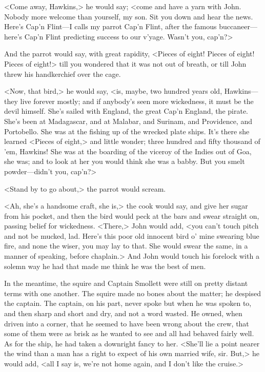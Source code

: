 <Come away, Hawkins,> he would say; <come and have a yarn with John. Nobody more welcome than yourself, my son. Sit you down and hear the news. Here's Cap'n Flint—I calls my parrot Cap'n Flint, after the famous buccaneer—here's Cap'n Flint predicting success to our v'yage. Wasn't you, cap'n?>

And the parrot would say, with great rapidity, <Pieces of eight! Pieces of eight! Pieces of eight!> till you wondered that it was not out of breath, or till John threw his handkerchief over the cage.

<Now, that bird,> he would say, <is, maybe, two hundred years old, Hawkins—they live forever mostly; and if anybody's seen more wickedness, it must be the devil himself. She's sailed with England, the great Cap'n England, the pirate. She's been at Madagascar, and at Malabar, and Surinam, and Providence, and Portobello. She was at the fishing up of the wrecked plate ships. It's there she learned <Pieces of eight,> and little wonder; three hundred and fifty thousand of 'em, Hawkins! She was at the boarding of the viceroy of the Indies out of Goa, she was; and to look at her you would think she was a babby. But you smelt powder—didn't you, cap'n?>

<Stand by to go about,> the parrot would scream.

<Ah, she's a handsome craft, she is,> the cook would say, and give her sugar from his pocket, and then the bird would peck at the bars and swear straight on, passing belief for wickedness. <There,> John would add, <you can't touch pitch and not be mucked, lad. Here's this poor old innocent bird o' mine swearing blue fire, and none the wiser, you may lay to that. She would swear the same, in a manner of speaking, before chaplain.> And John would touch his forelock with a solemn way he had that made me think he was the best of men.

In the meantime, the squire and Captain Smollett were still on pretty distant terms with one another. The squire made no bones about the matter; he despised the captain. The captain, on his part, never spoke but when he was spoken to, and then sharp and short and dry, and not a word wasted. He owned, when driven into a corner, that he seemed to have been wrong about the crew, that some of them were as brisk as he wanted to see and all had behaved fairly well. As for the ship, he had taken a downright fancy to her. <She'll lie a point nearer the wind than a man has a right to expect of his own married wife, sir. But,> he would add, <all I say is, we're not home again, and I don't like the cruise.>

